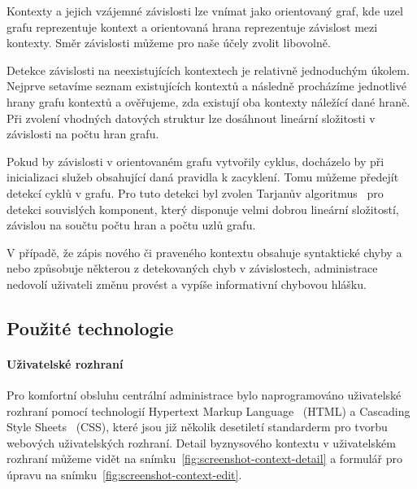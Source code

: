 Kontexty a jejich vzájemné závislosti lze vnímat jako
orientovaný graf, kde uzel grafu reprezentuje kontext
a orientovaná hrana reprezentuje závislost mezi kontexty.
Směr závislosti můžeme pro naše účely zvolit libovolně.

Detekce závislosti na neexistujících kontextech je relativně
jednoduchým úkolem. Nejprve setavíme seznam existujících kontextů
a následně procházíme jednotlivé hrany grafu kontextů a ověřujeme,
zda existují oba kontexty náležící dané hraně.
Při zvolení vhodných datových struktur lze dosáhnout
lineární složitosti v závislosti na počtu hran grafu.

Pokud by závislosti v orientovaném grafu vytvořily cyklus,
docházelo by při inicializaci služeb
obsahující daná pravidla k zacyklení. Tomu můžeme předejít
detekcí cyklů v grafu. Pro tuto detekci byl zvolen
Tarjanův algoritmus~\cite{tarjan1971depth} pro detekci souvislých
komponent, který disponuje velmi dobrou lineární složitostí,
závislou na součtu počtu hran a počtu uzlů grafu.

V případě, že zápis nového či praveného kontextu obsahuje syntaktické
chyby a nebo způsobuje některou z detekovaných chyb v závislostech,
administrace nedovolí uživateli změnu provést a vypíše informativní
chybovou hlášku.

\subsection{Použité technologie}

\paragraph{Uživatelské rozhraní}
Pro komfortní obsluhu centrální administrace bylo naprogramováno
uživatelské rozhraní pomocí technologií Hypertext Markup Language~\cite{berners1995hypertext}
(HTML) a Cascading Style Sheets~\cite{bos1998cascading} (\gls{CSS}), které jsou již několik
desetiletí standarderm pro tvorbu webových uživatelských rozhraní.
Detail byznysového kontextu v uživatelském rozhraní můžeme vidět na snímku~\ref{fig:screenshot-context-detail}
a formulář pro úpravu na snímku~\ref{fig:screenshot-context-edit}.



